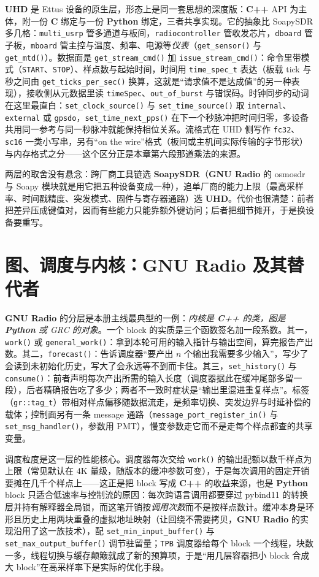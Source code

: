 \documentclass[12pt,a4paper,fontset=fandol]{ctexbook}
\newcommand{\Fn}[1]{\texttt{#1()}}
\newcommand{\Tp}[1]{\texttt{#1}}
\newcommand{\Bk}{\allowbreak}
\newcommand{\Lib}[1]{\textbf{#1}}
\newcommand{\Lang}[1]{\textsf{\bfseries #1}}
\newcommand{\CL}{\Lang{C}}
\newcommand{\CPP}{\Lang{C++}}
\newcommand{\PY}{\Lang{Python}}
\begin{document}
\Lib{UHD} 是 Ettus 设备的原生层，形态上是同一套思想的深度版：\CPP{} API 为主体，附一份 \CL{} 绑定与一份 \PY{} 绑定，三者共享实现。它的抽象比 SoapySDR 多几格：\Tp{multi\_usrp} \Bk{} 管多通道与板间，\Tp{radio\Bk controller} 管收发芯片，\Tp{dboard} 管子板，\Tp{mboard} 管主控与温度、频率、电源等\emph{仪表}（\Fn{get\_sensor} 与 \Fn{get\_mtd}）。数据面是 \Fn{get\_stream\_cmd} 加 \Fn{issue\_stream\_cmd}：命令里带模式（\Tp{START}、\Tp{STOP}）、样点数与起始时间，时间用 \Tp{time\_spec\_t} 表达（板载 tick 与秒之间由 \Fn{get\_ticks\_per\_sec} 换算，这就是``请求值不是达成值''的另一种表现），接收侧从元数据里读 \Tp{timeSpec}、\Tp{out\_of\_burst} 与错误码。时钟同步的动词在这里最直白：\Fn{set\_clock\_source} 与 \Fn{set\_time\_source} 取 \Tp{internal}、\Tp{external} 或 \Tp{gpsdo}，\Fn{set\_time\_next\_pps} 在下一个秒脉冲把时间归零，多设备共用同一参考与同一秒脉冲就能保持相位关系。流格式在 UHD 侧写作 \Tp{fc32}、\Tp{sc16} 一类小写串，另有``on the wire''格式（板间或主机间实际传输的字节形状）与内存格式之分——这个区分正是本章第六段那道乘法的来源。

两层的取舍没有悬念：跨厂商工具链选 \Lib{SoapySDR}（\Lib{GNU Radio} 的 osmosdr 与 Soapy 模块就是用它把五种设备变成一种），追单厂商的能力上限（最高采样率、时间戳精度、突发模式、固件与寄存器通路）选 \Lib{UHD}。代价也很清楚：前者把差异压成键值对，因而有些能力只能靠额外键访问；后者把细节摊开，于是换设备要重写。

\section{图、调度与内核：\Lib{GNU Radio} 及其替代者}

\Lib{GNU Radio} 的分层是本册主线最典型的一例：\emph{内核是 \CPP{} 的类，图是 \PY{} 或 GRC 的对象}。一个 block 的实质是三个函数签名加一段系数。其一，\Fn{work} 或 \Fn{general\_work}：拿到本轮可用的输入指针与输出空间，算完报告产出数。其二，\Fn{forecast}：告诉调度器``要产出 $n$ 个输出我需要多少输入''，写少了会读到未初始化历史，写大了会永远等不到而卡住。其三，\Fn{set\_history} 与 \Fn{consume}：前者声明每次产出所需的输入长度（调度器据此在缓冲尾部多留一段），后者精确报告吃了多少；两者不一致时症状是``输出里混进重复样点''。标签（\Tp{gr::tag\_t}）带相对样点偏移随数据流走，是频率切换、突发边界与时延补偿的载体；控制面另有一条 message 通路（\Fn{message\_port\_register\_in} 与 \Fn{set\_msg\_handler}，参数用 PMT），慢变参数走它而不是走每个样点都查的共享变量。

调度粒度是这一层的性能核心。调度器每次交给 \Fn{work} 的输出配额以数千样点为上限（常见默认在 $4\text{K}$ 量级，随版本的缓冲参数可变），于是每次调用的固定开销要摊在几千个样点上——这正是把 block 写成 \CPP{} 的收益来源，也是 \PY{} block 只适合低速率与控制流的原因：每次跨语言调用都要穿过 pybind11 的转换层并持有解释器全局锁，而这笔开销按\emph{调用次数}而不是按样点数计。缓冲本身是环形且历史上用两块重叠的虚拟地址映射（让回绕不需要拷贝，\Lib{GNU Radio} 的实现沿用了这一族技术），配 \Fn{set\_min\_input\_buffer} 与 \Fn{set\_max\_output\_buffer} 调节驻留量；\Tp{TPB} 调度器给每个 block 一个线程，块数一多，线程切换与缓存颠簸就成了新的预算项，于是``用几层容器把小 block 合成大 block''在高采样率下是实际的优化手段。
\end{document}

